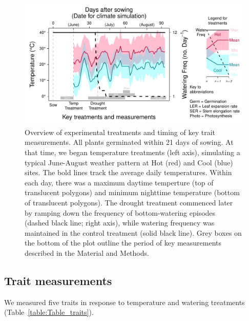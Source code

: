 \documentclass[11pt, oneside]{article}
\begin{document}

\begin{figure}[h!]
	\centerline{\includegraphics[width=1\textwidth]{Figures/Figure_ExptlDes.pdf}}
	\fontsize{10}{12}
	\selectfont
	\caption[Experimental Design]{Overview of experimental treatments and timing of key trait measurements. All plants germinated within 21 days of sowing. At that time, we began temperature treatments (left axis), simulating a typical June-August weather pattern at Hot (red) and Cool (blue) sites. The bold lines track the average daily temperatures. Within each day, there was a maximum daytime temperture (top of translucent polygons) and minimum nighttime temperature (bottom of translucent polygons). The drought treatment commenced later by ramping down the frequency of bottom-watering episodes (dashed black line; right axis), while watering frequency was maintained in the control treatment (solid black line). Grey boxes on the bottom of the plot outline the period of key measurements described in the Material and Methods.}
	\label{fig:Fig_ExptlDes}
\end{figure}

\subsection*{Trait measurements}

We measured five traits in response to temperature and watering treatments (Table~\ref{table:Table_traits}).

\end{document}
